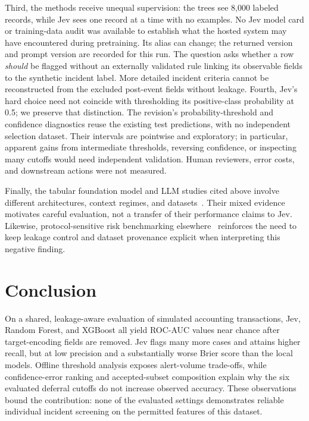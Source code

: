 \documentclass{llncs}
\begin{document}
Third, the methods receive unequal supervision: the trees see 8,000 labeled records, while Jev sees one record at a time with no examples. No Jev model card or training-data audit was available to establish what the hosted system may have encountered during pretraining. Its alias can change; the returned version and prompt version are recorded for this run. The question asks whether a row \emph{should} be flagged without an externally validated rule linking its observable fields to the synthetic incident label. More detailed incident criteria cannot be reconstructed from the excluded post-event fields without leakage. Fourth, Jev's hard choice need not coincide with thresholding its positive-class probability at 0.5; we preserve that distinction. The revision's probability-threshold and confidence diagnostics reuse the existing test predictions, with no independent selection dataset. Their intervals are pointwise and exploratory; in particular, apparent gains from intermediate thresholds, reversing confidence, or inspecting many cutoffs would need independent validation. Human reviewers, error costs, and downstream actions were not measured.

Finally, the tabular foundation model and LLM studies cited above involve different architectures, context regimes, and datasets~\cite{hollmann2025tabpfn,grushina2026llmtab,garnelo2026tabular}. Their mixed evidence motivates careful evaluation, not a transfer of their performance claims to Jev. Likewise, protocol-sensitive risk benchmarking elsewhere~\cite{mishra2026erp,zeng2026fraudbench} reinforces the need to keep leakage control and dataset provenance explicit when interpreting this negative finding.

\section{Conclusion}

On a shared, leakage-aware evaluation of simulated accounting transactions, Jev, Random Forest, and XGBoost all yield ROC-AUC values near chance after target-encoding fields are removed. Jev flags many more cases and attains higher recall, but at low precision and a substantially worse Brier score than the local models. Offline threshold analysis exposes alert-volume trade-offs, while confidence-error ranking and accepted-subset composition explain why the six evaluated deferral cutoffs do not increase observed accuracy. These observations bound the contribution: none of the evaluated settings demonstrates reliable individual incident screening on the permitted features of this dataset.
\end{document}
